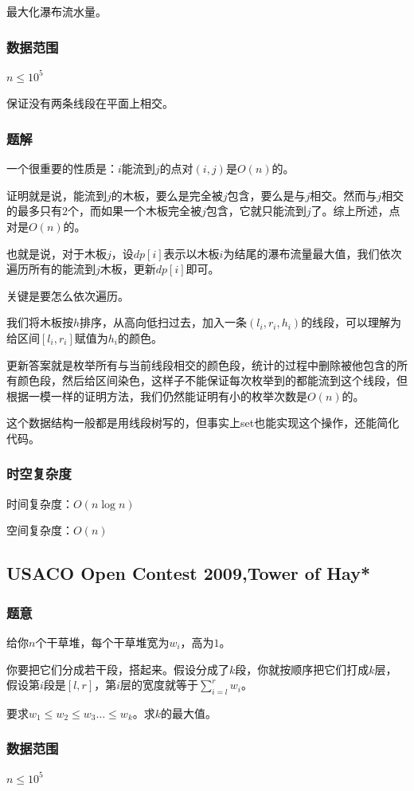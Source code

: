 \documentclass{ctexart}
\begin{document}
最大化瀑布流水量。
\subsubsection{数据范围}
$n \le 10^5$

保证没有两条线段在平面上相交。
\subsubsection{题解}
一个很重要的性质是：$i$能流到$j$的点对$(i,j)$是$O(n)$的。

证明就是说，能流到$j$的木板，要么是完全被$j$包含，要么是与$j$相交。然而与$j$相交的最多只有$2$个，而如果一个木板完全被$j$包含，它就只能流到$j$了。综上所述，点对是$O(n)$的。

也就是说，对于木板$j$，设$dp[i]$表示以木板$i$为结尾的瀑布流量最大值，我们依次遍历所有的能流到$j$木板，更新$dp[i]$即可。

关键是要怎么依次遍历。

我们将木板按$h$排序，从高向低扫过去，加入一条$(l_i,r_i,h_i)$的线段，可以理解为给区间$[l_i,r_i]$赋值为$h_i$的颜色。

更新答案就是枚举所有与当前线段相交的颜色段，统计的过程中删除被他包含的所有颜色段，然后给区间染色，这样子不能保证每次枚举到的都能流到这个线段，但根据一模一样的证明方法，我们仍然能证明有小的枚举次数是$O(n)$的。

这个数据结构一般都是用线段树写的，但事实上set也能实现这个操作，还能简化代码。
\subsubsection{时空复杂度}
时间复杂度：$O(n \log n)$

空间复杂度：$O(n)$
\subsection{USACO Open Contest 2009,Tower of Hay*}
\subsubsection{题意}
给你$n$个干草堆，每个干草堆宽为$w_i$，高为$1$。

你要把它们分成若干段，搭起来。假设分成了$k$段，你就按顺序把它们打成$k$层，假设第$i$段是$[l,r]$，第$i$层的宽度就等于$\sum\limits_{i=l}^r w_i$。

要求$w_1 \le w_2 \le w_3 \ldots \le w_k$。求$k$的最大值。
\subsubsection{数据范围}
$n \le 10^5$
\end{document}
